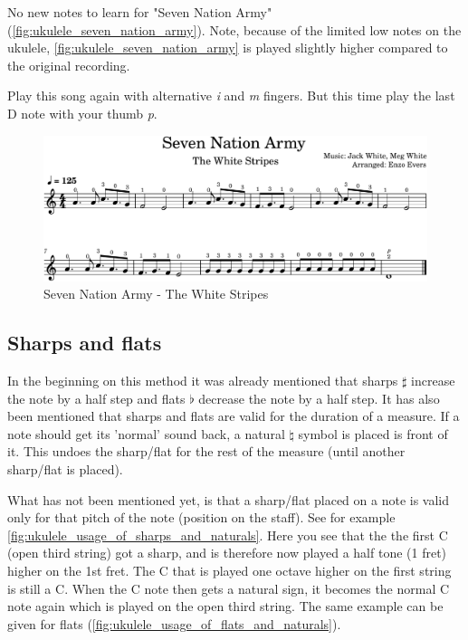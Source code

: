 \newpage

No new notes to learn for "Seven Nation Army" (\autoref{fig:ukulele_seven_nation_army}). Note, because of the limited low notes on the ukulele, \autoref{fig:ukulele_seven_nation_army} is played slightly higher compared to the original recording.

Play this song again with alternative \textit{i} and \textit{m} fingers. But this time play the last D note with your thumb \textit{p}.

\begin{figure}[h]
	\centering
	\includegraphics[width=\textwidth]{../../MuseScore/Ukulele/UkuleleSevenNationArmyTheWhiteStripes.png}
	\caption{Seven Nation Army - The White Stripes}
	\label{fig:ukulele_seven_nation_army}
\end{figure}

\newpage

\subsection{Sharps and flats}

In the beginning on this method it was already mentioned that sharps $\sharp$ increase the note by a half step and flats $\flat$ decrease the note by a half step. It has also been mentioned that sharps and flats are valid for the duration of a measure. If a note should get its 'normal' sound back, a natural $\natural$ symbol is placed is front of it. This undoes the sharp/flat for the rest of the measure (until another sharp/flat is placed).

What has not been mentioned yet, is that a sharp/flat placed on a note is valid only for that pitch of the note (position on the staff). See for example \autoref{fig:ukulele_usage_of_sharps_and_naturals}. Here you see that the the first C (open third string) got a sharp, and is therefore now played a half tone (1 fret) higher on the 1st fret. The C that is played one octave higher on the first string is still a C. When the C note then gets a natural sign, it becomes the normal C note again which is played on the open third string. The same example can be given for flats (\autoref{fig:ukulele_usage_of_flats_and_naturals}).

